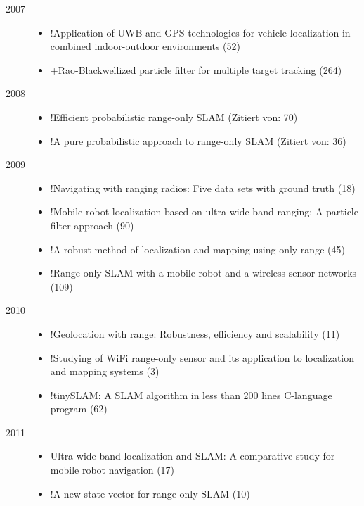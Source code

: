 \begin{description}
\item[2007]
\begin{itemize}
\item !Application of UWB and GPS technologies for vehicle localization in combined indoor-outdoor environments (52)
\item +Rao-Blackwellized particle filter for multiple target tracking (264)
\end{itemize}

\item[2008]
\begin{itemize}
\item !Efficient probabilistic range-only SLAM (Zitiert von: 70)
\item !A pure probabilistic approach to range-only SLAM (Zitiert von: 36)
\end{itemize}

\item[2009]
\begin{itemize}
\item !Navigating with ranging radios: Five data sets with ground truth (18)
\item !Mobile robot localization based on ultra-wide-band ranging: A particle filter approach (90)
\item !A robust method of localization and mapping using only range (45)
\item !Range-only SLAM with a mobile robot and a wireless sensor networks (109)
\end{itemize}

\item[2010]
\begin{itemize}
\item !Geolocation with range: Robustness, efficiency and scalability (11)
\item !Studying of WiFi range-only sensor and its application to localization and mapping systems (3)
\item !tinySLAM: A SLAM algorithm in less than 200 lines C-language program (62)
\end{itemize}

\item[2011]
\begin{itemize}
\item Ultra wide-band localization and SLAM: A comparative study for mobile robot navigation (17)
\item !A new state vector for range-only SLAM (10)
\end{itemize}


\end{description}
